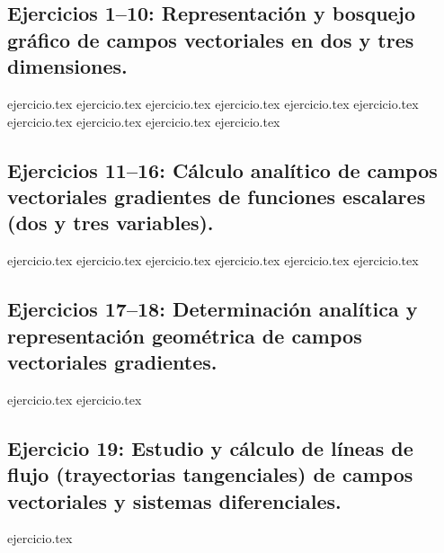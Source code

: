 
\subsection*{Ejercicios 1--10: Representación y bosquejo gráfico de campos vectoriales en dos y tres dimensiones.}
\begin{enumerate}
    {ejercicio.tex}
    {ejercicio.tex}
    {ejercicio.tex}
    {ejercicio.tex}
    {ejercicio.tex}
    {ejercicio.tex}
    {ejercicio.tex}
    {ejercicio.tex}
    {ejercicio.tex}
    {ejercicio.tex}
\end{enumerate}

\subsection*{Ejercicios 11--16: Cálculo analítico de campos vectoriales gradientes de funciones escalares (dos y tres variables).}
\begin{enumerate}
    \setcounter{enumi}{10}
    {ejercicio.tex}
    {ejercicio.tex}
    {ejercicio.tex}
    {ejercicio.tex}
    {ejercicio.tex}
    {ejercicio.tex}
\end{enumerate}

\subsection*{Ejercicios 17--18: Determinación analítica y representación geométrica de campos vectoriales gradientes.}
\begin{enumerate}
    \setcounter{enumi}{16}
    {ejercicio.tex}
    {ejercicio.tex}
\end{enumerate}

\subsection*{Ejercicio 19: Estudio y cálculo de líneas de flujo (trayectorias tangenciales) de campos vectoriales y sistemas diferenciales.}
{ejercicio.tex}
